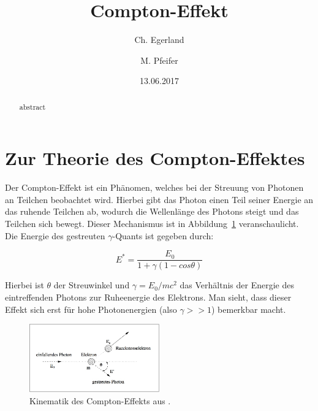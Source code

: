 \documentclass[aps,twocolumn,secnumarabic,nobalancelastpage,amsmath,amssymb,
nofootinbib,superscriptaddress]{revtex4-1}
\begin{document}
\title{Compton-Effekt}
\author         {Ch. Egerland}
\author         {M. Pfeifer}

\date[Versuchsdatum: ]{13.06.2017}

\begin{abstract}
  abstract
\end{abstract}


\maketitle



\section{Zur Theorie des Compton-Effektes}
Der Compton-Effekt ist ein Phänomen, welches bei der Streuung von Photonen an
Teilchen beobachtet wird. Hierbei gibt das Photon einen Teil seiner Energie an das
ruhende Teilchen ab, wodurch die Wellenlänge des Photons steigt und das Teilchen
sich bewegt. Dieser Mechanismus ist in Abbildung~\ref{fig:kinematik} veranschaulicht.
Die Energie des gestreuten $\gamma$-Quants ist gegeben durch:

  \begin{equation}
    E^* = \frac{E_0}{1+\gamma(1- cos \theta)}
    \label{eq:streuenergie}
  \end{equation}

Hierbei ist $\theta$ der Streuwinkel und $\gamma = E_0/mc^2$ das Verhältnis der
Energie des eintreffenden Photons zur Ruheenergie des Elektrons. Man sieht, dass
dieser Effekt sich erst für hohe Photonenergien (also $\gamma >> 1$) bemerkbar
macht.

\begin{figure}[h]
  \centering
  \includegraphics[width=0.5\textwidth]{comptstreu_schema.jpeg}
  \caption{\label{fig:kinematik} Kinematik des Compton-Effekts aus \cite{skript07}.}
\end{figure}
\end{document}
